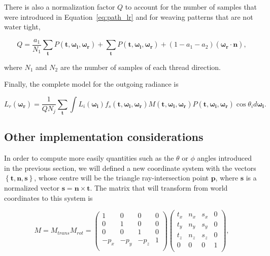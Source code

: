 \documentclass[12pt]{article}
\newcommand{\omegai}{\boldsymbol{\omega_i}}
\newcommand{\omegar}{\boldsymbol{\omega_r}}
\newcommand{\tb}{\mathbf{t}}
\begin{document}
There is also a normalization factor $Q$ to account for the number of samples that were introduced in Equation~\ref{eq:path_lr} and for weaving patterns that are not water tight,

\begin{equation}
Q = \frac{a_1}{N_1} \sum_\tb P(\tb, \omegai, \omegar) + \sum_\tb P(\tb, \omegai, \omegar) + (1 - a_1 - a_2)(\omegar \cdot \mathbf{n}),
\end{equation}

where $N_1$ and $N_2$ are the number of samples of each thread direction.

Finally, the complete model for the outgoing radiance is

\begin{equation}
L_{r}(\omegar) = \frac{1}{Q N_j} \sum_\tb \int L_i(\omegai) f_s(\tb, \omegai, \omegar) M(\tb, \omegai, \omegar) P(\tb, \omegai, \omegar)  \cos \theta_i d \omegai.
\end{equation}

\subsection{Other implementation considerations}

In order to compute more easily quantities such as the $\theta$ or $\phi$ angles introduced in the previous section, we will defined a new coordinate system with the vectors $\left\lbrace \tb,\mathbf{n},\mathbf{s} \right\rbrace$, whose centre will be the triangle ray-intersection point $\mathbf{p}$, where $\mathbf{s}$ is a normalized vector $\mathbf{s} = \mathbf{n} \times \tb$.
The matrix that will transform from world coordinates to this system is

\begin{equation}
M = M_{trans}M_{rot} =
\begin{pmatrix}
1 & 0 & 0 & 0 \\
0 & 1 & 0 & 0 \\
0 & 0 & 1 & 0 \\
-p_x & -p_y & -p_z & 1 \\
\end{pmatrix}
\begin{pmatrix}
t_x & n_x & s_x & 0 \\
t_y & n_y & s_y & 0 \\
t_z & n_z & s_z & 0 \\
0 & 0 & 0 & 1 \\
\end{pmatrix},
\end{equation}
\end{document}
